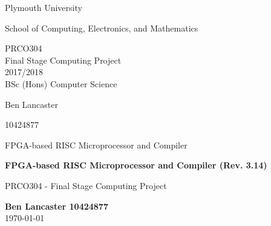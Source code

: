\documentclass[11pt,a4paper]{report}
\newcommand{\dlatestv}{3.14}
\begin{document}

\makeatletter
\DeclareRobustCommand*{\nameref}{%
\color{blue}%
        \@ifstar\T@nameref\T@nameref
        }%
\makeatother

\begin{titlepage}
\begin{center}
\vspace*{2cm}

\Huge
Plymouth University

\vspace{2cm}
\huge
School of Computing, Electronics, and Mathematics

\vspace{2cm}
\huge
PRCO304\\
Final Stage Computing Project\\
2017/2018\\

\vspace{1.5cm}
\huge
BSc (Hons) Computer Science


\Large
\vspace{1.5cm}
Ben Lancaster

\vspace{1cm}
10424877

\vspace{1cm}
FPGA-based RISC Microprocessor and Compiler




\end{center}
\end{titlepage}


\newpage
\begin{titlepage}
\begin{center}

\vspace*{5cm}
\Large

{\color{blue9d}
\textbf{
FPGA-based RISC Microprocessor and Compiler (Rev. \dlatestv{})
}
}

\vspace{0.4cm}
\large
PRCO304 - Final Stage Computing Project

\vspace{4cm}
\textbf{Ben Lancaster 10424877}\\
\today 


\end{center}

\end{titlepage}
\end{document}
